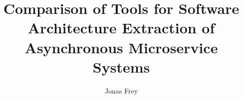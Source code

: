 \documentclass[twoside, english]{sdqseminar}
\author{Jonas Frey}
\title{Comparison of Tools for Software Architecture Extraction of Asynchronous Microservice Systems}
\begin{document}
\setpdf

\maketitle

 

\begin{abstract}

\end{abstract}








\printbibliography[heading=bibintoc]
\end{document}
